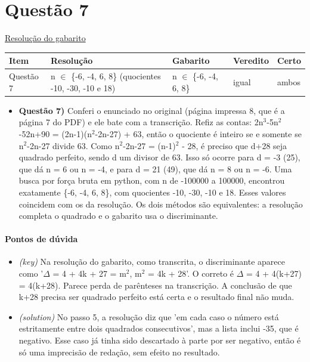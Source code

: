 \documentclass{article}%
\begin{document}
\section*{Questão 7}%
\href{https://poliedroresolve.sistemapoliedro.com.br/vestibulares/ita/2027/ita-2-fase-dia-1-20-10-2026-2-fase-dia-1/dissertativa-7-matematica-2-fase-dia-1-ita-2027}{Resolução do gabarito}\par\smallskip%
\begin{longtable}{@{}p{} p{} p{} p{} p{}@{}}\toprule Item & Resolução & Gabarito & Veredito & Certo \\ \midrule
Questão 7 & n $\in$ \{-6, -4, 6, 8\} (quocientes -10, -30, -10 e 18) & n $\in$ \{-6, -4, 6, 8\} & igual & ambos \\
\bottomrule\end{longtable}%
\begin{itemize}%
\item%
\textbf{Questão 7)} Conferi o enunciado no original (página impressa 8, que é a página 7 do PDF) e ele bate com a transcrição. Refiz as contas: 2n$^3$-5n$^2$-52n+90 = (2n-1)(n$^2$-2n-27) + 63, então o quociente é inteiro se e somente se n$^2$-2n-27 divide 63. Como n$^2$-2n-27 = (n-1)$^2$ - 28, é preciso que d+28 seja quadrado perfeito, sendo d um divisor de 63. Isso só ocorre para d = -3 (25), que dá n = 6 ou n = -4, e para d = 21 (49), que dá n = 8 ou n = -6. Uma busca por força bruta em python, com n de -100000 a 100000, encontrou exatamente \{-6, -4, 6, 8\}, com quocientes -10, -30, -10 e 18. Esses valores coincidem com os da resolução. Os dois métodos são equivalentes: a resolução completa o quadrado e o gabarito usa o discriminante.%
\end{itemize}%
\paragraph{Pontos de dúvida}%
\begin{itemize}%
\item%
\textit{(key)} Na resolução do gabarito, como transcrita, o discriminante aparece como '$\Delta$ = 4 + 4k + 27 = m$^2$, m$^2$ = 4k + 28'. O correto é $\Delta$ = 4 + 4(k+27) = 4(k+28). Parece perda de parênteses na transcrição. A conclusão de que k+28 precisa ser quadrado perfeito está certa e o resultado final não muda.%
\item%
\textit{(solution)} No passo 5, a resolução diz que 'em cada caso o número está estritamente entre dois quadrados consecutivos', mas a lista inclui -35, que é negativo. Esse caso já tinha sido descartado à parte por ser negativo, então é só uma imprecisão de redação, sem efeito no resultado.%
\end{itemize}%
\end{document}
